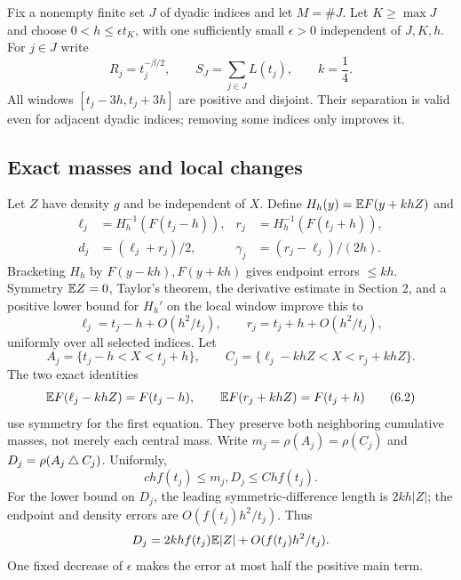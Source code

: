 Fix a nonempty finite set $J$ of dyadic indices and let $M=\#J$. Let $K\ge\max J$ and choose $0<h\le\epsilon t_K$, with one sufficiently small $\epsilon>0$ independent of $J,K,h$. For $j\in J$ write
\[
 R_j=t_j^{-\beta/2},\qquad S_J=\sum_{j\in J}L(t_j),\qquad k=\frac14.
\]
All windows $[t_j-3h,t_j+3h]$ are positive and disjoint. Their separation is valid even for adjacent dyadic indices; removing some indices only improves it.

\subsection{Exact masses and local changes}
Let $Z$ have density $g$ and be independent of $X$. Define $H_h(y)=\mathbb E F(y+khZ)$ and
\begin{align*}
 \ell_j&=H_h^{-1}(F(t_j-h)),&r_j&=H_h^{-1}(F(t_j+h)),\\
 d_j&=(\ell_j+r_j)/2,&\gamma_j&=(r_j-\ell_j)/(2h).
\end{align*}
Bracketing $H_h$ by $F(y-kh),F(y+kh)$ gives endpoint errors $\le kh$. Symmetry $\mathbb E Z=0$, Taylor's theorem, the derivative estimate in Section 2, and a positive lower bound for $H_h'$ on the local window improve this to
\begin{equation}
 \ell_j=t_j-h+O(h^2/t_j),\qquad r_j=t_j+h+O(h^2/t_j),\tag{6.1}
\end{equation}
uniformly over all selected indices. Let
\[
 A_j=\{t_j-h<X<t_j+h\},\qquad
 C_j=\{\ell_j-khZ<X<r_j+khZ\}.
\]
The two exact identities
\begin{equation}
 \mathbb E F(\ell_j-khZ)=F(t_j-h),\qquad
 \mathbb E F(r_j+khZ)=F(t_j+h)\tag{6.2}
\end{equation}
use symmetry for the first equation. They preserve both neighboring cumulative masses, not merely each central mass. Write $m_j=\rho(A_j)=\rho(C_j)$ and $D_j=\rho(A_j\mathbin{\triangle} C_j)$. Uniformly,
\begin{equation}
 chf(t_j)\le m_j,D_j\le Chf(t_j).\tag{6.3}
\end{equation}
For the lower bound on $D_j$, the leading symmetric-difference length is $2kh|Z|$; the endpoint and density errors are $O(f(t_j)h^2/t_j)$. Thus
\[
 D_j=2khf(t_j)\mathbb E|Z|+O(f(t_j)h^2/t_j).
\]
One fixed decrease of $\epsilon$ makes the error at most half the positive main term.

